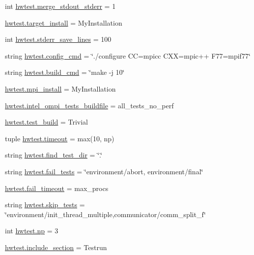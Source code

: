 \begin{DoxyCompactItemize}
\item 
int \hyperlink{namespacehwtest_a48f78a49ff7c6103a9c7c8565ec98438}{hwtest.\-merge\-\_\-stdout\-\_\-stderr} = 1
\item 
\hyperlink{namespacehwtest_ae44fdc8b804d0261bc648dc81fccf671}{hwtest.\-target\-\_\-install} = My\-Installation
\item 
int \hyperlink{namespacehwtest_aa6450e0e7dfc9a867ed2a7a81477aba2}{hwtest.\-stderr\-\_\-save\-\_\-lines} = 100
\item 
string \hyperlink{namespacehwtest_aae03e4589fc182736e73d50bbb74346e}{hwtest.\-config\-\_\-cmd} = \char`\"{}./configure C\-C=mpicc C\-X\-X=mpic++ F77=mpif77\char`\"{}
\item 
string \hyperlink{namespacehwtest_a5378e5bba23994a3a52c3381e619b18b}{hwtest.\-build\-\_\-cmd} = \char`\"{}make -\/j 10\char`\"{}
\item 
\hyperlink{namespacehwtest_a92b45acc8d45d80d6032cba2a6b6dd5e}{hwtest.\-mpi\-\_\-install} = My\-Installation
\item 
\hyperlink{namespacehwtest_a6047a9d712208748ac55f9c3e2bcc0ce}{hwtest.\-intel\-\_\-ompi\-\_\-tests\-\_\-buildfile} = all\-\_\-tests\-\_\-no\-\_\-perf
\item 
\hyperlink{namespacehwtest_a5ba5b6a44052b71d5033b0673947ced0}{hwtest.\-test\-\_\-build} = Trivial
\item 
tuple \hyperlink{namespacehwtest_a71b9053f13108a7a4c06692c840d6308}{hwtest.\-timeout} = max(10, np)
\item 
string \hyperlink{namespacehwtest_af3c2c504aec4d3d87f8382d577e362ca}{hwtest.\-find\-\_\-test\-\_\-dir} = \char`\"{}.\char`\"{}
\item 
string \hyperlink{namespacehwtest_ad08296b7abe004e90b638ec9eb5c0c30}{hwtest.\-fail\-\_\-tests} = \char`\"{}environment/abort, environment/final\char`\"{}
\item 
\hyperlink{namespacehwtest_a30cc5b5edc143ffd8006c27213d903f9}{hwtest.\-fail\-\_\-timeout} = max\-\_\-procs
\item 
string \hyperlink{namespacehwtest_ae1b5040a9a3c1b72300a18fc85116bc4}{hwtest.\-skip\-\_\-tests} = \char`\"{}environment/init\-\_\-thread\-\_\-multiple,communicator/comm\-\_\-split\-\_\-f\char`\"{}
\item 
int \hyperlink{namespacehwtest_a91f9231befdd013bc572920c4f6320ff}{hwtest.\-np} = 3
\item 
\hyperlink{namespacehwtest_a62c9c5709c2605f42860f5424551007f}{hwtest.\-include\-\_\-section} = Testrun
\item 

\end{DoxyCompactItemize}
